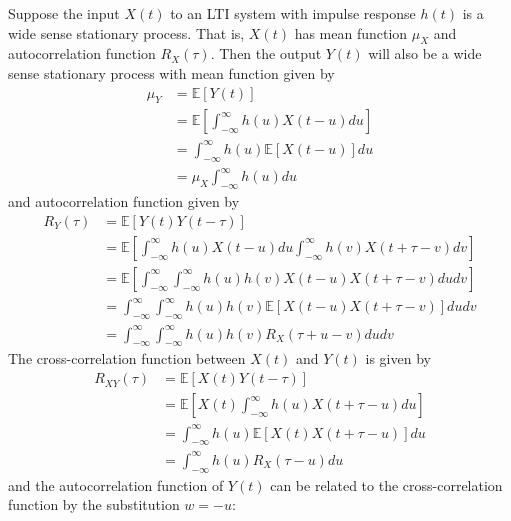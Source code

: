 \documentclass[11pt]{report} %
\begin{document}
Suppose the input $X\left(t\right)$ to an LTI system with impulse response $h\left(t\right)$ is a wide sense stationary process. That is, $X\left(t\right)$ has mean function $\mu_{X}$ and autocorrelation function $R_{X}\left(\tau\right)$. Then the output $Y\left(t\right)$ will also be a wide sense stationary process with mean function given by
\begin{align}
\mu_{Y} &= \mathbb{E}\left[Y\left(t\right)\right] \\
&= \mathbb{E}\left[\int_{-\infty}^{\infty}h\left(u\right)X\left(t - u\right)du\right] \\
&= \int_{-\infty}^{\infty}h\left(u\right)\mathbb{E}\left[X\left(t - u\right)\right]du \\
&= \mu_{X}\int_{-\infty}^{\infty}h\left(u\right)du
\end{align}
and autocorrelation function given by
\begin{align}
R_{Y}\left(\tau\right) &= \mathbb{E}\left[Y\left(t\right)Y\left(t-\tau\right)\right] \\
&= \mathbb{E}\left[\int_{-\infty}^{\infty}h\left(u\right)X\left(t-u\right)du\int_{-\infty}^{\infty}h\left(v\right)X\left(t+\tau-v\right)dv\right] \\
&= \mathbb{E}\left[\int_{-\infty}^{\infty}\int_{-\infty}^{\infty}h\left(u\right)h\left(v\right)X\left(t-u\right)X\left(t+\tau-v\right)dudv\right] \\
&= \int_{-\infty}^{\infty}\int_{-\infty}^{\infty}h\left(u\right)h\left(v\right)\mathbb{E}\left[X\left(t-u\right)X\left(t+\tau-v\right)\right]dudv \\
&= \int_{-\infty}^{\infty}\int_{-\infty}^{\infty}h\left(u\right)h\left(v\right)R_{X}\left(\tau+u-v\right)dudv
\end{align}
The cross-correlation function between $X\left(t\right)$ and $Y\left(t\right)$ is given by
\begin{align}
R_{XY}\left(\tau\right) &= \mathbb{E}\left[X\left(t\right)Y\left(t-\tau\right)\right] \\
&= \mathbb{E}\left[X\left(t\right)\int_{-\infty}^{\infty}h\left(u\right)X\left(t+\tau-u\right)du\right] \\
&= \int_{-\infty}^{\infty}h\left(u\right)\mathbb{E}\left[X\left(t\right)X\left(t+\tau-u\right)\right]du \\
&= \int_{-\infty}^{\infty}h\left(u\right)R_{X}\left(\tau-u\right)du
\end{align}
and the autocorrelation function of $Y\left(t\right)$ can be related to the cross-correlation function by the substitution $w = -u$:
\end{document}
